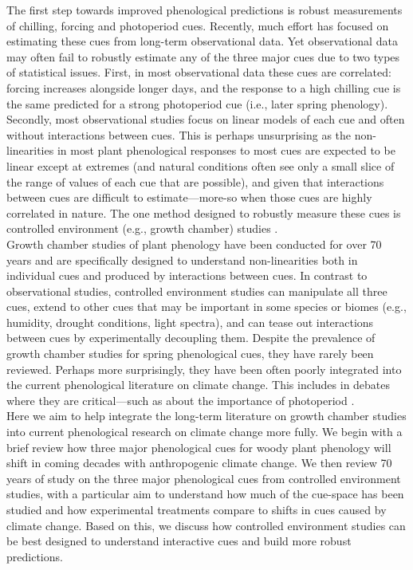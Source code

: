 \documentclass[11pt,letter]{article}
\begin{document}
The first step towards improved phenological predictions is robust measurements of chilling, forcing and photoperiod cues. Recently, much effort has focused on estimating these cues from long-term observational data. Yet observational data may often fail to robustly estimate any of the three major cues due to two types of statistical issues. First, in most observational data these cues are correlated: forcing increases alongside longer days, and the response to a high chilling cue is the same predicted for a strong photoperiod cue (i.e., later spring phenology). Secondly, most observational studies focus on linear models of each cue and often without interactions between cues. This is perhaps unsurprising as the non-linearities in most plant phenological responses to most cues are expected to be linear except at extremes (and natural conditions often see only a small slice of the range of values of each cue that are possible), and given that interactions between cues are difficult to estimate---more-so when those cues are highly correlated in nature. The one method designed to robustly measure these cues is controlled environment (e.g., growth chamber) studies \citep{nagano2012,satake2013}.\\

Growth chamber studies of plant phenology have been conducted for over 70 years and are specifically designed to understand non-linearities both in individual cues and produced by interactions between cues. In contrast to observational studies, controlled environment studies can manipulate all three cues, extend to other cues that may be important in some species or biomes (e.g., humidity, drought conditions, light spectra), and can tease out interactions between cues by experimentally decoupling them. Despite the prevalence of growth chamber studies for spring phenological cues, they have rarely been reviewed. Perhaps more surprisingly, they have been often poorly integrated into the current phenological literature on climate change. This includes in debates where they are critical---such as about the importance of photoperiod \citep[e.g.,]{fu2015,richspurce2018}.\\

Here we aim to help integrate the long-term literature on growth chamber studies into current phenological research on climate change more fully. We begin with a brief review how three major phenological cues for woody plant phenology will shift in coming decades with anthropogenic climate change. We then review 70 years of study on the three major phenological cues from controlled environment studies, with a particular aim to understand how much of the cue-space has been studied and how experimental treatments compare to shifts in cues caused by climate change. Based on this, we discuss how controlled environment studies can be best designed to understand interactive cues and build more robust predictions.\\
\end{document}
